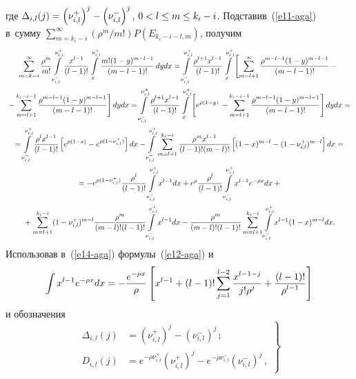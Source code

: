   
\noindent
где $\Delta_{i,l}(j) =\left( \nu^+_{i,l}\right)^j\hm- \left( \nu^-_{i,l}\right)^j$,
$0\hm< l\hm\leq m\hm\leq k_i\hm-i$.
%
Подставив~(\ref{e11-aga}) в~сумму $\sum\limits_{m=k_i-i}^\infty  (\rho^m/m!)
P\left( E_{k_i-i-l,m}\right)$, получим
\begin{multline}
\sum\limits^\infty_{m=k-i} \fr{\rho^m}{m!}\int\limits_{\nu^-_{i,l}}^{\nu^+_{i,l}}
\fr{x^{l-1}}{(l-1)!} \int\limits_x^{\nu_{i,l}^+} \fr{m!(1-y)^{m-l-1}}{(m-l-
1)!}\,dydx= \int\limits_{\nu^-_{i,l}}^{\nu^+_{i,l}} \fr{\rho^{l+1} x^{l-1}}{(l-1)!}
\int\limits_x^{\nu^+_{i,l}}\left[ \sum\limits_{m=l+1}^\infty \fr{\rho^{m-l-1}(1-
y)^{m-l-1}}{(m-l-1)!}-{}\right.\\
\left.{}- \sum\limits_{m=l+1}^{k_i-i-1} \fr{\rho^{m-l-1}(1-y)^{m-l-1}}{(m-l-1)!}
\right] dydx= \int\limits_{\nu^-_{i,l}}^{\nu^+_{i,l}} \fr{\rho^{l+1} x^{l-1}}{(l-1)!}
\int\limits_x^{\nu^+_{i,l}} \left[ 
\vphantom{\sum\limits_{m=l+1}^{k_i-i-1}}
e^{\rho(1-y)} \right.
\left.-\sum\limits_{m=l+1}^{k_i-i-1} \fr{\rho^{m-l-1}(1-y)^{m-l-1}}{(m-l-1)!}
\right] dydx={}\\
{}= \int\limits_{\nu^-_{i,l}}^{\nu^+_{i,l}} \fr{\rho^l x^{l-1}}{(l-1)!} \left[
e^{\rho(1-x)}-e^{\rho(1-\nu^+_{i,l})}\right]dx-
\int\limits_{\nu^-_{i,l}}^{\nu^+_{i,l}} \sum\limits_{m=l+1}^{k_i-i} \fr{\rho^m
x^{l-1}}{(l-1)! (m-l)!} \left[ 
(1-x)^{m-l}-
(1-\nu^+_{i,l})^{m-l}\right]dx= {}\\
{}=
-e^{\rho(1-\nu^+_{i,l})} \fr{\rho^l}{(l-1)!}
 \int\limits_{\nu^-_{i,l}}^{\nu^+_{i,l}} x^{l-1}dx +e^\rho \fr{\rho^l}{(l-1)!} \int\limits_{\nu^-
_{i,l}}^{\nu^+_{i,l}} x^{l-1} e^{-\rho x}dx+{}\\
{}+ \sum\limits_{m=l+1}^{k_i-i} (1-\nu^+_{i,l})^{m-l} \fr{\rho^m}{(m-l)! (l-1)!}
\int\limits_{\nu^-_{i,l}}^{\nu^+_{i,l}} x^{l-1}dx- %
 \fr{\rho^m}{(m-l)! (l-1)!} \sum\limits_{m=l+1}^{k_i-i} 
 \int\limits_{\nu^-_{i,l}}^{\nu^+_{i,l}} x^{l-1} (1-x)^{m-l}dx.
\label{e14-aga}
\end{multline}
Использовав в~(\ref{e14-aga}) формулы~(\ref{e12-aga}) 
и
\begin{equation*}
\int x^{l-1}e^{-\rho x} dx = 
-\displaystyle\frac{\displaystyle e^{-\rho x}\mathstrut}{\displaystyle \rho\mathstrut} \left[ x^{l-1}+(l-1)!
\sum\limits_{j=1}^{l-2} \displaystyle\frac{\displaystyle x^{l-1-j}\mathstrut}{\displaystyle j!\rho^j\mathstrut} +\displaystyle\frac{\displaystyle (l-1)!\mathstrut}{\displaystyle \rho^{l-1}\mathstrut}\right]
\end{equation*}
и обозначения
\begin{equation}
\left.
\begin{array}{rl}
\Delta_{i,l}(j) &=\left( \nu^+_{i,l}\right)^j -\left(\nu^-_{i,l}\right)^j\,;\\
D_{i,l}(j) &= e^{-\rho \nu^+_{i,l}}\left( \nu^+_{i,l}\right)^j -
e^{-\rho
\nu^-_{i,l}}\left( \nu^-_{i,l}\right)^j\,,
\end{array}
\right\}
\label{e15-aga}
\end{equation}

